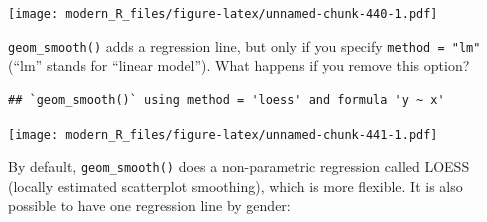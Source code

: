 \documentclass[]{gitbook}
\newenvironment{Shaded}{\begin{snugshade}}{\end{snugshade}}
\newcommand{\DataTypeTok}[1]{\textcolor[rgb]{0.13,0.29,0.53}{#1}}
\newcommand{\KeywordTok}[1]{\textcolor[rgb]{0.13,0.29,0.53}{\textbf{#1}}}
\newcommand{\NormalTok}[1]{#1}
\newcommand{\OperatorTok}[1]{\textcolor[rgb]{0.81,0.36,0.00}{\textbf{#1}}}
\newcommand{\StringTok}[1]{\textcolor[rgb]{0.31,0.60,0.02}{#1}}
\begin{document}
\texttt{[image: modern\_R\_files/figure-latex/unnamed-chunk-440-1.pdf]}

\texttt{geom\_smooth()} adds a regression line, but only if you specify \texttt{method\ =\ "lm"} (``lm'' stands for
``linear model''). What happens if you remove this option?

\begin{Shaded}
\end{Shaded}

\begin{verbatim}
## `geom_smooth()` using method = 'loess' and formula 'y ~ x'
\end{verbatim}

\texttt{[image: modern\_R\_files/figure-latex/unnamed-chunk-441-1.pdf]}

By default, \texttt{geom\_smooth()} does a non-parametric regression called LOESS (locally estimated scatterplot smoothing),
which is more flexible. It is also possible to have one regression line by gender:

\begin{Shaded}
\end{Shaded}
\end{document}

